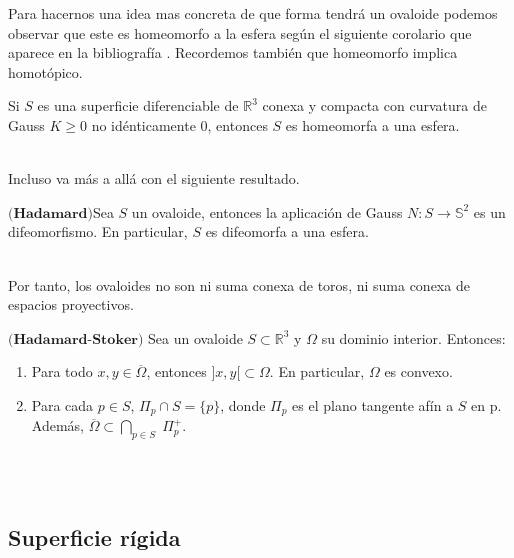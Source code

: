 \begin{definicion}
Para hacernos una idea mas concreta de que forma tendrá un ovaloide podemos observar que este es homeomorfo a la esfera según el siguiente corolario que aparece en la bibliografía \cite{ref1}. Recordemos también que homeomorfo implica homotópico.
${ }$\\

\begin{corolario}
	Si $S$ es una superficie diferenciable de $\mathbb{R}^3$ conexa y compacta con curvatura de Gauss $K \geq 0$ no idénticamente $0$, entonces $S$ es homeomorfa a una esfera.
\end{corolario}
${ }$\\

Incluso va más a allá con el siguiente resultado.
${ }$\\

\begin{teorema}
	$\textbf{(Hadamard)}$Sea $S$ un ovaloide, entonces la aplicación de Gauss $N : S \to \mathbb{S}^2$ es un difeomorfismo. En particular, $S$ es difeomorfa a una esfera.
\end{teorema}
${ }$\\

Por tanto, los ovaloides no son ni suma conexa de toros, ni suma conexa de espacios proyectivos.
${ }$\\

\begin{teorema} \label{teo:hadamard}
	$\textbf{(Hadamard-Stoker)}$ Sea un ovaloide $S \subset \mathbb{R}^3$ y $\Omega$ su dominio interior. Entonces:
	
	\begin{enumerate}
		\item Para todo $x, y \in \overline{\Omega}$, entonces $]x, y[ \subset \Omega$. En particular, $\Omega$ es convexo.
		\item Para cada $p \in S$, $\Pi_p \cap S = \{p\}$, donde $\Pi_p$ es el plano tangente afín a $S$ en p. Además, $\overline{\Omega} \subset \bigcap_{p \in S} \; \Pi^{+}_{p}$.
	\end{enumerate}
\end{teorema}
${ }$\\


${ }$\\
\subsection{Superficie rígida}
${ }$\\


\end{definicion}
